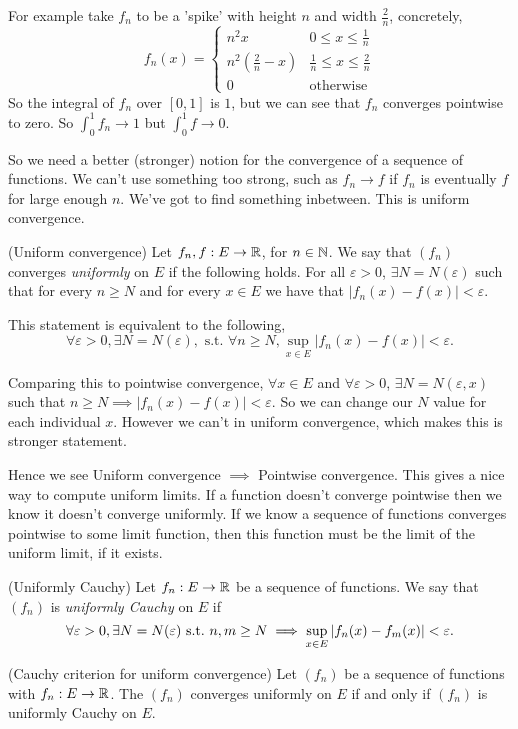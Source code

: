 \documentclass{article}
\newcommand{\eps}{\varepsilon}
\begin{document}
For example take $ f_n $ to be a 'spike' with height $ n $ and width $ \frac 2n $, concretely,
\[
  f_n(x)=\begin{cases}
	  n^2x& 0\le x \le \frac 1n \\
	  n^2(\frac 2n - x) & \frac 1n \le x \le \frac 2n \\
	  0 & \text{otherwise}
  \end{cases}
\]
So the integral of $ f_n $ over $ [0,1] $ is $ 1 $, but we can see that $ f_n $ converges pointwise to zero. So $ \int_0 ^1 f_n\to 1 $ but $ \int_0 ^1f\to0 $.\par So we need a better (stronger) notion for the convergence of a sequence of functions.
We can't use something too strong, such as $ f_n \to f$ if $ f_n $ is eventually $ f $ for large enough $ n $. We've got to find something inbetween. This is uniform convergence.
\begin{definition}
	(Uniform convergence) Let $ f_n,f: E\to \mathbb{R} $, for $ n\in\mathbb{N} $. We say that $ (f_n) $ converges \textit{uniformly} on $ E $ if the following holds. For all $ \eps>0 $, $ \exists N=N(\eps) $ such that for every $ n\ge N $ and for every $ x\in E $ we have that $ |f_n(x)-f(x)|<\eps $.
\end{definition}
\begin{remark}
  This statement is equivalent to the following,
  \[
	  \forall\eps >0,\exists N=N(\eps), \text{ s.t. } \forall n\ge N, \sup_{x\in E}|f_n(x)-f(x)|<\eps.
  \]
\end{remark}
Comparing this to pointwise convergence, $ \forall x \in E $ and $ \forall \eps>0 $, $ \exists N=N(\eps,x) $ such that $ n\ge N\implies |f_n(x)-f(x)|<\eps $. So we can change our $ N $ value for each individual $ x $. However we can't in uniform convergence, which makes this is stronger statement.\par
Hence we see Uniform convergence $ \implies $ Pointwise convergence.
This gives a nice way to compute uniform limits. If a function doesn't converge pointwise then we know it doesn't converge uniformly. If we know a sequence of functions converges pointwise to some limit function, then this function must be the limit of the uniform limit, if it exists.
\begin{definition}
	(Uniformly Cauchy) Let $ f_n:E\to \mathbb{R} $ be a sequence of functions. We say that $ (f_n) $ is \textit{uniformly Cauchy} on $ E $ if
	\[
		\forall \eps >0, \exists N=N(\eps) \st n,m\ge N\implies \sup_{x\in E}|f_n(x)-f_m(x)|<\eps.
	\]
\end{definition}
\begin{theorem}
	(Cauchy criterion for uniform convergence) Let $ (f_n) $ be a sequence of functions with $ f_n:E\to \mathbb{R} $. The $ (f_n) $ converges uniformly on $ E $ if and only if $ (f_n) $ is uniformly Cauchy on $ E $.
\end{theorem}
\end{document}
